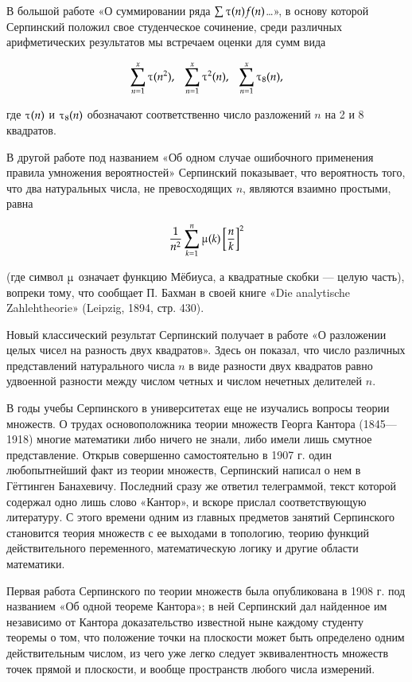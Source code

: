\documentclass[12pt, a4paper, openany]{book}
\begin{document}
	В большой работе «О суммировании ряда $ \sum \tauup(n)f(n)$\ldots», в основу которой Серпинский положил свое студенческое сочинение, среди различных арифметических результатов мы встречаем оценки для сумм вида
	
	$$
	\sum_{n=1}^{x} \tauup(n^2),\ \ \  	\sum_{n=1}^{x} \tauup^2(n),\ \ \ \sum_{n=1}^{x} \tauup_8(n),
	$$
	
\noindent	где $\tauup(n)$ и $\tauup_8(n)$ обозначают соответственно число разложений $n$ на 2 и 8 квадратов.

В другой работе под названием «Об одном случае ошибочного применения правила умножения вероятностей» Серпинский показывает, что вероятность того, что два натуральных числа, не превосходящих $n$, являются взаимно простыми, равна

$$
\frac{1}{n^2} \sum_{k=1}^{n} \muup(k) \left[ \frac{n}{k} \right]^2
$$

\noindent (где символ $\muup$ означает функцию Мёбиуса, а квадратные скобки — целую часть), вопреки тому, что сообщает П. Бахман в своей книге «Die analytische Zahlehtheorie» (Leipzig, 1894, стр. 430).

Новый классический результат Серпинский получает в работе «О разложении целых чисел на разность двух квадратов». Здесь он показал, что число различных представлений натурального числа $n$ в виде разности двух квадратов равно удвоенной разности между числом четных и числом нечетных делителей $n$.

В годы учебы Серпинского в университетах еще не изучались вопросы теории множеств. О трудах основоположника теории множеств Георга Кантора (1845—1918) многие математики либо ничего не знали, либо имели лишь смутное представление. Открыв совершенно самостоятельно в 1907 г. один любопытнейший факт из теории множеств, Серпинский написал о нем в Гёттинген Банахевичу. Последний сразу же ответил телеграммой, текст которой содержал одно лишь слово «Кантор», и вскоре прислал соответствующую литературу. С этого времени одним из главных предметов занятий Серпинского становится теория множеств с ее выходами в топологию, теорию функций действительного переменного, математическую логику и другие области математики.

Первая работа Серпинского по теории множеств была опубликована в 1908 г. под названием «Об одной теореме Кантора»; в ней Серпинский дал найденное им независимо от Кантора доказательство известной ныне каждому студенту теоремы о том, что положение точки на плоскости может быть определено одним действительным числом, из чего уже легко следует эквивалентность множеств точек прямой и плоскости, и вообще пространств любого числа измерений.
\end{document}
